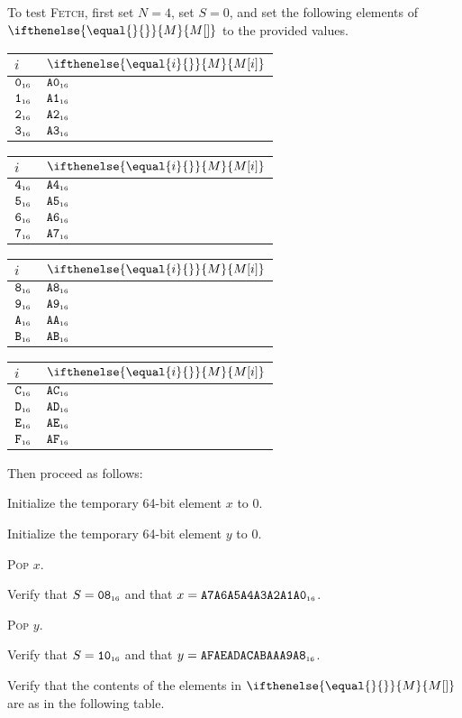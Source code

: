 \documentclass[a4paper,12pt]{article}
\makeatletter
\newcommand{\num}[1]{\texttt{#1}}
\newcommand{\hex}[1]{\num{#1}_{\textup{\tiny 16}}}
\newcommand{\MEM}[1]{\ifthenelse{\equal{#1}{}}{M}{M[#1]}}
\newcommand{\SP}{S}
\newcommand{\proc}[1]{\textsc{#1}}
\newenvironment{memtable}{%
  \begin{trivlist}
    \item
    }{%
    \end{trivlist}}
\newenvironment{memcolumn}{%
  \begin{tabular}{@{}ll@{}}
    $i$ & $\MEM{i}$ \\
    \hline}
    {%
    \hline
  \end{tabular}}
\newcommand{\memspace}{\qquad}
\makeatother
\begin{document}
To test \proc{Fetch}, first set $N=4$, set $S=0$, and set the following elements of $\MEM{}$ to the provided values.
\begin{memtable}
  \begin{memcolumn}
    $\hex{0}$ & $\hex{A0}$ \\
    $\hex{1}$ & $\hex{A1}$ \\
    $\hex{2}$ & $\hex{A2}$ \\
    $\hex{3}$ & $\hex{A3}$ \\
  \end{memcolumn}
  \memspace
  \begin{memcolumn}
    $\hex{4}$ & $\hex{A4}$ \\
    $\hex{5}$ & $\hex{A5}$ \\
    $\hex{6}$ & $\hex{A6}$ \\
    $\hex{7}$ & $\hex{A7}$ \\
  \end{memcolumn}
  \memspace
  \begin{memcolumn}
    $\hex{8}$ & $\hex{A8}$ \\
    $\hex{9}$ & $\hex{A9}$ \\
    $\hex{A}$ & $\hex{AA}$ \\
    $\hex{B}$ & $\hex{AB}$ \\
  \end{memcolumn}
  \memspace
  \begin{memcolumn}
    $\hex{C}$ & $\hex{AC}$ \\
    $\hex{D}$ & $\hex{AD}$ \\
    $\hex{E}$ & $\hex{AE}$ \\
    $\hex{F}$ & $\hex{AF}$ \\
  \end{memcolumn}
\end{memtable}
Then proceed as follows:
\begin{stepnumbers}
\item Initialize the temporary 64-bit element $x$ to $0$.
\item Initialize the temporary 64-bit element $y$ to $0$.
\item \proc{Pop} $x$.
\item Verify that $\SP = \hex{08}$ and that $x = \hex{A7A6A5A4A3A2A1A0}$.
\item \proc{Pop} $y$.
\item Verify that $\SP = \hex{10}$ and that $y = \hex{AFAEADACABAAA9A8}$.
\item Verify that the contents of the elements in $\MEM{}$ are as in the following table.
\end{stepnumbers}
\end{document}
